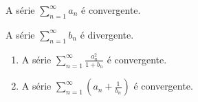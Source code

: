 \documentclass[11pt, a4paper]{article}
\begin{document}

\begin{proposition}\label{prop:af1-ex8-an-convergente}
	A série $\sum_{n=1}^{\infty} a_n$ é convergente.
\end{proposition}

\begin{proposition}\label{prop:af1-ex8-bn-divergente}
	A série $\sum_{n=1}^{\infty} b_n$ é divergente.
\end{proposition}


\begin{enumerate}[label=\arabic{section}.\arabic*.]
	\item
		\begin{proposition}
			A série $\sum_{n=1}^{\infty} \frac{a_n^2}{1 + b_n}$ é convergente.
		\end{proposition}
	\item
		\begin{proposition}
			A série $\sum_{n=1}^{\infty} \left(a_n + \frac{1}{b_n}\right)$ é convergente.
		\end{proposition}
\end{enumerate}

\end{document}
